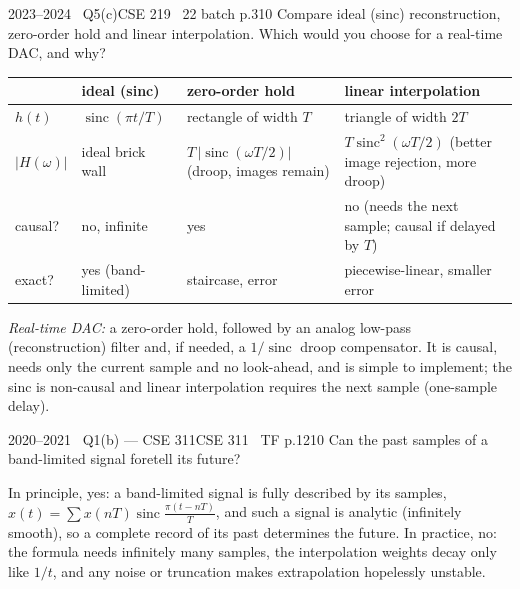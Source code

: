 \begin{qcard}{2023--2024 \textbullet\ Q5(c)}{CSE 219 \textbullet\ 22 batch p.3}{10}
Compare ideal (sinc) reconstruction, zero-order hold and linear interpolation. Which would you choose for a real-time DAC, and why?
\end{qcard}
\begin{solution}
\begin{center}\small\renewcommand{\arraystretch}{1.25}\begin{tabular}{@{}p{2.6cm}p{3.4cm}p{3.4cm}p{3.6cm}@{}}\toprule&ideal (sinc)&zero-order hold&linear interpolation\\\midrule
$h(t)$&$\operatorname{sinc}(\pi t/T)$&rectangle of width $T$&triangle of width $2T$\\
$|H(\omega)|$&ideal brick wall&$T\,|\operatorname{sinc}(\omega T/2)|$ (droop, images remain)&$T\operatorname{sinc}^2(\omega T/2)$ (better image rejection, more droop)\\
causal?&no, infinite&yes&no (needs the next sample; causal if delayed by $T$)\\
exact?&yes (band-limited)&staircase, error&piecewise-linear, smaller error\\\bottomrule\end{tabular}\end{center}
\emph{Real-time DAC:} a zero-order hold, followed by an analog low-pass (reconstruction) filter and, if needed, a $1/\operatorname{sinc}$ droop compensator. It is causal, needs only the current sample and no look-ahead, and is simple to implement; the sinc is non-causal and linear interpolation requires the next sample (one-sample delay).
\end{solution}

\begin{qcard}{2020--2021 \textbullet\ Q1(b) --- CSE 311}{CSE 311 \textbullet\ TF p.12}{10}
Can the past samples of a band-limited signal foretell its future?
\end{qcard}
\begin{solution}
In principle, yes: a band-limited signal is fully described by its samples, $x(t)=\sum x(nT)\operatorname{sinc}\frac{\pi(t-nT)}{T}$, and such a signal is analytic (infinitely smooth), so a complete record of its past determines the future. In practice, no: the formula needs infinitely many samples, the interpolation weights decay only like $1/t$, and any noise or truncation makes extrapolation hopelessly unstable.
\end{solution}

